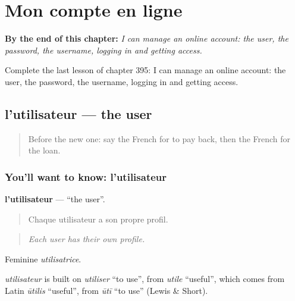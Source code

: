 
\chapter{Mon compte en ligne}
\label{ch:fr-mon-compte-en-ligne}

\begin{chapteropening}
\textbf{By the end of this chapter:} \emph{I can manage an online account: the user, the password, the username, logging in and getting access.}

Complete the last lesson of chapter 395: I can manage an online account: the user, the password, the username, logging in and getting access.
\end{chapteropening}

\section[l'utilisateur]{l'utilisateur — the user}

\label{lesson:FR-C395-utilisateur}



\begin{quote}
Before the new one: say the French for to pay back, then the French for the loan.
\end{quote}

\subsection*{You'll want to know: l'utilisateur}
\textbf{l'utilisateur} — \textquotedblleft{}the user\textquotedblright{}.

\begin{quote}
Chaque utilisateur a son propre profil.
\end{quote}

\begin{quote}
\emph{Each user has their own profile.}
\end{quote}

Feminine \emph{utilisatrice}.

\begin{cousinweb}
\emph{utilisateur} is built on \emph{utiliser} \textquotedblleft{}to use\textquotedblright{}, from \emph{utile} \textquotedblleft{}useful\textquotedblright{}, which comes from Latin \emph{ūtilis} \textquotedblleft{}useful\textquotedblright{}, from \emph{ūtī} \textquotedblleft{}to use\textquotedblright{} (Lewis \& Short).
\end{cousinweb}

